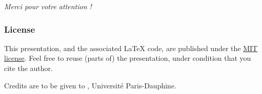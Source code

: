\documentclass[french]{beamer}
\begin{document}
\begin{frame}[plain]
	\addtocounter{framenumber}{-1}
	\begin{center}
		\huge
		\textit{Merci pour votre attention !}
	\end{center}
\end{frame}

% 	

\clearpage{}
\begin{frame}[plain]
	\frametitle{License}
	This presentation, and the associated \LaTeX{} code, are published under the \href{https://opensource.org/licenses/MIT}{MIT license}. Feel free to reuse (parts of) the presentation, under condition that you cite the author.
	
	Credits are to be given to , Université Paris-Dauphine.
\end{frame}
\addtocounter{framenumber}{-1}
\end{document}
